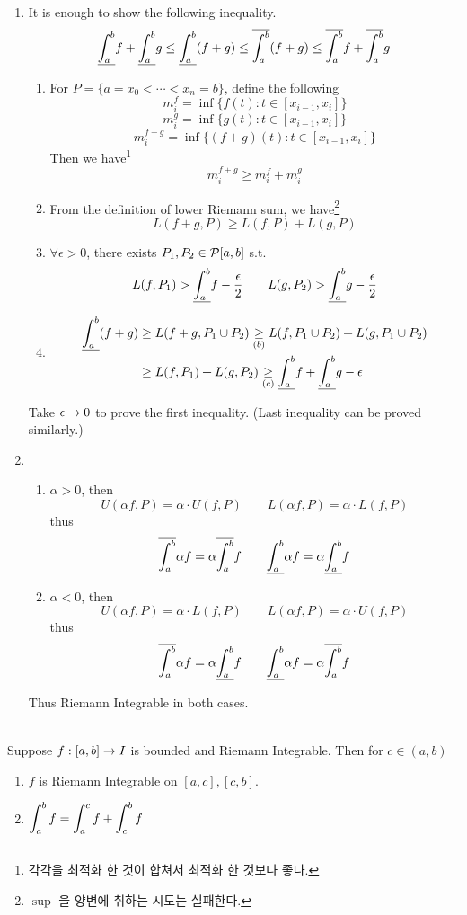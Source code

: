 \begin{enumerate}
	\item It is enough to show the following inequality.
	$$ \underline{\int_a^b}f + \underline{\int_a^b} g \leq \underline{\int_a^b} (f+g) \leq \overline{\int_a^b} (f+g) \leq \overline{\int_a^b} f + \overline{\int_a^b} g $$
	\begin{enumerate}
		\item For $P = \{a = x_0 < \cdots < x_n=b\}$, define the following $$m_{i}^f = \inf\{f(t):t\in [x_{i-1}, x_i] \}$$ $$m_{i}^g = \inf \{g(t):t\in [x_{i-1}, x_i] \}$$ $$m_{i}^{f+g} = \inf \{(f+g)(t) : t\in [x_{i-1}, x_i] \}$$
		Then we have\footnote{각각을 최적화 한 것이 합쳐서 최적화 한 것보다 좋다.} $$m_{i}^{f+g} \geq m_{i}^f + m_{i}^g$$
		\item From the definition of lower Riemann sum, we have\footnote{$\sup$ 을 양변에 취하는 시도는 실패한다.} $$L(f+g, P)\geq L(f, P) + L(g, P) $$
		\item $\forall\epsilon>0$, there exists $P_1, P_2\in \mathcal{P}[a, b]$ s.t.
		$$L(f, P_1) > \underline{\int_a^b}f - \frac{\epsilon}{2} \qquad L(g, P_2) > \underline{\int_a^b} g- \frac{\epsilon}{2}$$
		\item $$\begin{aligned}
			\underline{\int_a^b} (f+g) &\geq L(f+g, P_1\cup P_2) \underset{(b)}{\geq} L(f, P_1\cup P_2) + L(g, P_1\cup P_2) \\
			&\geq L(f, P_1) + L(g, P_2) \underset{(c)}{\geq} \underline{\int_a^b} f + \underline{\int_a^b} g -\epsilon
		\end{aligned}$$
	\end{enumerate}
	Take $\epsilon \rightarrow 0$ to prove the first inequality. (Last inequality can be proved similarly.)
	\item
	\begin{enumerate}
		\item $\alpha > 0$, then
		$$U(\alpha f, P) = \alpha \cdot U(f, P) \qquad L(\alpha f, P) = \alpha \cdot L(f, P)$$
		thus $$ \overline{\int_a^b} \alpha f = \alpha \overline{\int_a^b} f \qquad \underline{\int_a^b} \alpha f = \alpha \underline{\int_a^b} f$$
		\item $\alpha < 0$, then
		$$U(\alpha f, P) = \alpha \cdot L(f, P) \qquad L(\alpha f, P) = \alpha \cdot U(f, P)$$
		thus $$ \overline{\int_a^b} \alpha f = \alpha \underline{\int_a^b} f \qquad \underline{\int_a^b} \alpha f = \alpha \overline{\int_a^b} f$$
	\end{enumerate}
	Thus Riemann Integrable in both cases.
\end{enumerate}~\\
 Suppose $f:[a, b]\rightarrow I$ is bounded and Riemann Integrable. Then for $c\in (a, b)$
\begin{enumerate}
	\item $f$ is Riemann Integrable on $[a, c], [c, b]$.
	\item $\displaystyle \int_a^b f = \int_a^c f + \int_c^b f$
\end{enumerate}
